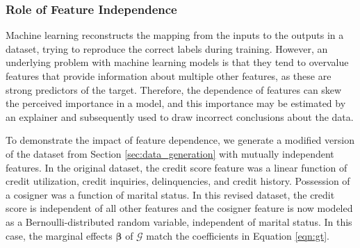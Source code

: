 \documentclass[12pt]{article}  %
\begin{document}
  \subsubsection{Role of Feature Independence}
    \label{sec:role_of_correlation}\vspace{-3mm} 
Machine learning reconstructs the mapping from the inputs to the outputs in a dataset, trying to reproduce the correct labels during training. However, an underlying problem with machine learning models is that they tend to overvalue features that provide information about multiple other features, as these are strong predictors of the target. 
Therefore, the dependence of features can skew the perceived importance in a model, and this importance may be estimated by an explainer and subsequently used to draw incorrect conclusions about the data. %

To demonstrate the impact of feature dependence, we generate a modified version of the dataset from Section \ref{sec:data_generation} with mutually independent features. In the original dataset, the credit score feature was a linear function of credit utilization, credit inquiries, delinquencies, and credit history. Possession of a cosigner was a function of marital status. In this revised dataset, the credit score is independent of all other features and the cosigner feature is now modeled as a Bernoulli-distributed random variable, independent of marital status. In this case, the marginal effects $\boldsymbol{\beta}$ of $\mathcal{G}$ match the coefficients in Equation \ref{eqn:gt}. %
\end{document}
